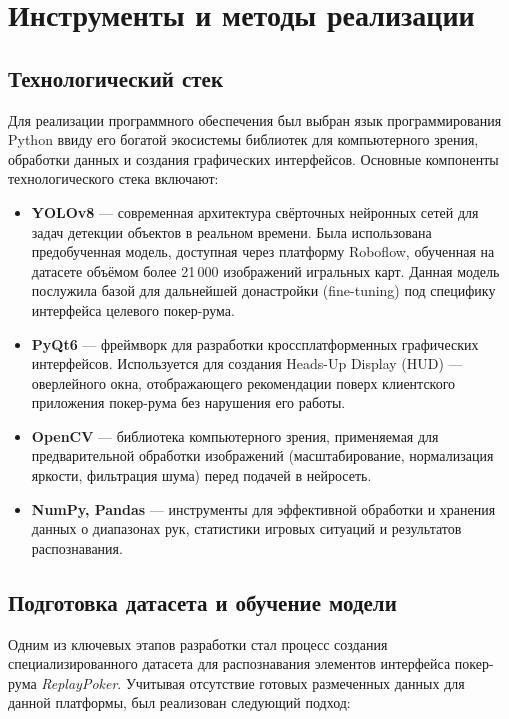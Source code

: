 \section{Инструменты и методы реализации}

\subsection{Технологический стек}
Для реализации программного обеспечения был выбран язык программирования Python ввиду его богатой экосистемы библиотек для компьютерного зрения, обработки данных и создания графических интерфейсов. Основные компоненты технологического стека включают:

\begin{itemize}
    \item \textbf{YOLOv8} --- современная архитектура свёрточных нейронных сетей для задач детекции объектов в реальном времени. Была использована предобученная модель, доступная через платформу Roboflow, обученная на датасете объёмом более 21\,000 изображений игральных карт. Данная модель послужила базой для дальнейшей донастройки (fine-tuning) под специфику интерфейса целевого покер-рума.
    
    \item \textbf{PyQt6} --- фреймворк для разработки кроссплатформенных графических интерфейсов. Используется для создания Heads-Up Display (HUD) --- оверлейного окна, отображающего рекомендации поверх клиентского приложения покер-рума без нарушения его работы.
    
    \item \textbf{OpenCV} --- библиотека компьютерного зрения, применяемая для предварительной обработки изображений (масштабирование, нормализация яркости, фильтрация шума) перед подачей в нейросеть.
    
    \item \textbf{NumPy, Pandas} --- инструменты для эффективной обработки и хранения данных о диапазонах рук, статистики игровых ситуаций и результатов распознавания.
\end{itemize}

\subsection{Подготовка датасета и обучение модели}
Одним из ключевых этапов разработки стал процесс создания специализированного датасета для распознавания элементов интерфейса покер-рума \textit{ReplayPoker}. Учитывая отсутствие готовых размеченных данных для данной платформы, был реализован следующий подход:

